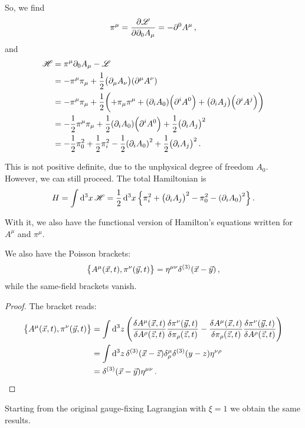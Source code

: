 \documentclass[main.tex]{subfiles}
\begin{document}
So, we find 
%
\begin{align}
\pi^{\mu } = \pdv{\mathscr{L}}{\partial_0 A_{\mu }}
= - \partial^{0} A^{\mu }
\,,
\end{align}
%
and 
%
\begin{subequations}
\begin{align}
\mathscr{H} &= \pi^{\mu } \partial_0 A_{\mu }
- \mathscr{L}   \\
&= - \pi^{\mu } \pi_{\mu }
+ \frac{1}{2} \qty(\partial_{\mu } A_{\nu })\qty(\partial^{\mu } A^{\nu })  \\
&= - \pi^{\mu } \pi_{\mu } + \frac{1}{2} \qty(+ \pi_{\mu }\pi^{\mu } + \qty( \partial_{i } A_{0}) \qty(\partial^{i }A^{0})
+ \qty(\partial_{i} A_{j}) \qty(\partial^{i} A^{j}) )  \\
&= - \frac{1}{2} \pi^{\mu } \pi_{\mu }
+ \frac{1}{2}\qty(\partial_{i } A_{0})\qty(\partial^{i }A^{0})
+ \frac{1}{2} \qty(\partial_{i } A_{j})^2  \\
&=-\frac{1}{2} \pi_{0}^2
+ \frac{1}{2} \pi_{i}^2
- \frac{1}{2}\qty(\partial_{i} A_{0})^2
+ \frac{1}{2} \qty(\partial_{i } A_{j})^2 
\,.
\end{align}
\end{subequations}

This is not positive definite, due to the unphysical degree of freedom \(A_0 \).
However, we can still proceed. The total Hamiltonian is 
%
\begin{align}
H = \int \dd[3]{x} \mathscr{H} = \frac{1}{2} \dd[3]{x}
\qty{ \pi_{i}^2  + \qty(\partial_{i} A_{j})^2 - \pi_0^2 - \qty(\partial_{i} A_{0})^2}
\,.
\end{align}

With it, we also have the functional version of Hamilton's equations written for \(A^{\mu }\) and \(\pi^{\mu }\). 

\begin{claim}
We also have the Poisson brackets: 
%
\begin{align}
    \qty{A^{\mu } (\vec{x}, t), \pi^{\nu }(\vec{y}, t)} = \eta^{\mu \nu }
    \delta^{(3)} (\vec{x} - \vec{y})
    \,,
\end{align}
%
while the same-field brackets vanish.
\end{claim} 

\begin{proof}
The bracket reads: 
%
\begin{subequations}
\begin{align}
\qty{A^{\mu } (\vec{x}, t), \pi^{\nu }(\vec{y}, t)}
&= \int \dd[3]{z} \qty(
\fdv{A^{\mu }(\vec{x}, t)}{A^{\rho }(\vec{z}, t)}
\fdv{\pi ^{\nu }(\vec{y}, t)}{\pi _{\rho }(\vec{z}, t)}
-
\fdv{A^{\mu }(\vec{x}, t)}{\pi _{\rho }(\vec{z}, t)}
\fdv{\pi ^{\nu }(\vec{y}, t)}{A^{\rho }(\vec{z}, t)}
)  \\
&= \int \dd[3]{z} \delta^{(3)} (\vec{x} - \vec{z}) \delta^{\mu }_{\rho }
\delta^{(3)}(y-z) \eta^{\nu \rho }  \\
&= \delta^{(3)} (\vec{x} - \vec{y}) \eta^{\mu \nu }
\,.
\end{align}
\end{subequations}
\end{proof}

\begin{claim}
Starting from the original gauge-fixing Lagrangian with \(\xi = 1\) we obtain the same results. 
\end{claim}

\end{document}
